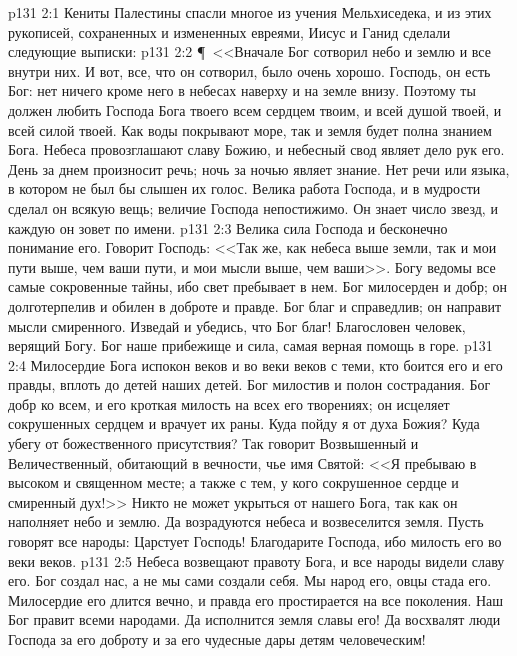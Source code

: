 \vs p131 2:1 Кениты Палестины спасли многое из учения Мельхиседека, и из этих рукописей, сохраненных и измененных евреями, Иисус и Ганид сделали следующие выписки:
\vs p131 2:2 \P\ <<Вначале Бог сотворил небо и землю и все внутри них. И вот, все, что он сотворил, было очень хорошо. Господь, он есть Бог: нет ничего кроме него в небесах наверху и на земле внизу. Поэтому ты должен любить Господа Бога твоего всем сердцем твоим, и всей душой твоей, и всей силой твоей. Как воды покрывают море, так и земля будет полна знанием Бога. Небеса провозглашают славу Божию, и небесный свод являет дело рук его. День за днем произносит речь; ночь за ночью являет знание. Нет речи или языка, в котором не был бы слышен их голос. Велика работа Господа, и в мудрости сделал он всякую вещь; величие Господа непостижимо. Он знает число звезд, и каждую он зовет по имени.
\vs p131 2:3 Велика сила Господа и бесконечно понимание его. Говорит Господь: <<Так же, как небеса выше земли, так и мои пути выше, чем ваши пути, и мои мысли выше, чем ваши>>. Богу ведомы все самые сокровенные тайны, ибо свет пребывает в нем. Бог милосерден и добр; он долготерпелив и обилен в доброте и правде. Бог благ и справедлив; он направит мысли смиренного. Изведай и убедись, что Бог благ! Благословен человек, верящий Богу. Бог наше прибежище и сила, самая верная помощь в горе.
\vs p131 2:4 Милосердие Бога испокон веков и во веки веков с теми, кто боится его и его правды, вплоть до детей наших детей. Бог милостив и полон сострадания. Бог добр ко всем, и его кроткая милость на всех его творениях; он исцеляет сокрушенных сердцем и врачует их раны. Куда пойду я от духа Божия? Куда убегу от божественного присутствия? Так говорит Возвышенный и Величественный, обитающий в вечности, чье имя Святой: <<Я пребываю в высоком и священном месте; а также с тем, у кого сокрушенное сердце и смиренный дух!>> Никто не может укрыться от нашего Бога, так как он наполняет небо и землю. Да возрадуются небеса и возвеселится земля. Пусть говорят все народы: Царстует Господь! Благодарите Господа, ибо милость его во веки веков.
\vs p131 2:5 Небеса возвещают правоту Бога, и все народы видели славу его. Бог создал нас, а не мы сами создали себя. Мы народ его, овцы стада его. Милосердие его длится вечно, и правда его простирается на все поколения. Наш Бог правит всеми народами. Да исполнится земля славы его! Да восхвалят люди Господа за его доброту и за его чудесные дары детям человеческим!
